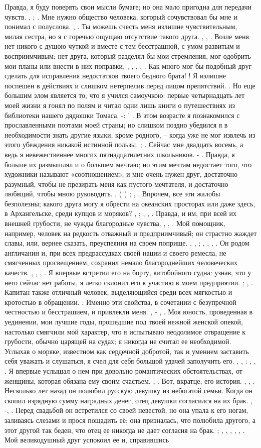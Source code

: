 Правда, я буду поверять свои мысли бумаге; но она мало пригодна для передачи чувств. , ; . Мне нужно общество человека, когорый сочувствовал бы мне и понимал с полуслова. , . Ты можешь счесть меня излишне чувствительным, милая сестра, но я с горечью ощущаю отсутствие такого друга. , , . Возле меня нет никого с душою чуткой и вместе с тем бесстрашной, с умом развитым и восприимчивым; нет друга, который разделял бы мои стремления, мог одобрить мои планы или внести в них поправки. , , , , . Как много мог бы подобный друг сделать для исправления недостатков твоего бедного брата! ! Я излишне поспешен в действиях и слишком нетерпелив перед лицом препятствий. . Но еще большим злом является то, что я учился самоучкою: первые четырнадцать лет моей жизни я гонял по полям и читал одни лишь книги о путешествиях из библиотеки нашего дядюшки Томаса. -: ' . В этом возрасте я познакомился с прославленными поэтами моей страны; но слишком поздно убедился я в необходимости знать другие языки, кроме родного, – когда уже не мог извлечь из этого убеждения никакой истинной пользы. ; . Сейчас мне двадцать восемь, а ведь я невежественнее многих пятнадцатилетних школьников. - . Правда, я больше их размышлял и о большем мечтаю; но этим мечтам недостает того, что художники называют «соотношением», и мне очень нужен друг, достаточно разумный, чтобы не презирать меня как пустого мечтателя, и достаточно любящий, чтобы мною руководить. , ( ) ; , . Впрочем, все эти жалобы безполезны; какого друга могу я обрести на океанских просторах или даже здесь, в Архангельске, среди купцов и моряков? , ; , , . Правда, и им, при всей их внешней грубости, не чужды благородные чувства. , , . Мой помощник, например, человек на редкость отважный и предприимчивый; он страстно жаждет славы, или, вернее сказать, преуспеяния на своем поприще. , , ; , , , . Он родом англичанин и, при всех предрассудках своей нации и своего ремесла, не смягченных просвещением, сохранил немало благороднейших человеческих качеств. , , , . Я впервые встретил его на борту, китобойного судна: узнав, что у него сейчас нет работы, я легко склонил его к участию в моем предприятии. ; , . Капитан также отличный человек, выделяющийся среди всех мягкостью и кротостью в обращении. . Именно эти свойства, в сочетании с безупречной честностью и бесстрашием, и привлекли меня. , - , . Моя юность, проведенная в уединении, мои лучшие годы, прошедшие под твоей нежной женской опекой, настолько смягчили мой характер, что я испытываю неодолимое отвращение к грубости, обычно царящей на судах; я никогда не считал ее необходимой. Услыхав о моряке, известном как сердечной добротой, так и умением заставить себя уважать и слушаться, я счел для себя большой удачей заполучить его. , , : , , . Я впервые услышал о нем при довольно романтических обстоятельствах, от женщины, которая обязана ему своим счастьем. , . Вот, вкратце, его история. , , . Несколько лет назад он полюбил русскую девушку из небогатой семьи. Когда он скопил изрядную сумму наградных денег, отец девушки согласился на их брак. , -, . Перед свадьбой он встретился со своей невестой; но она упала к его ногам, заливаясь слезами и прося пощадить её; она призналась, что полюбила другого, а этот другой так беден, что отец ее никогда не дает согласия на брак. ; , , , , , . Мой великодушный друг успокоил ее и, справившись 